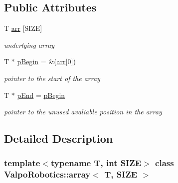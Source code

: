 \subsection*{Public Attributes}
\begin{DoxyCompactItemize}
\item 
\mbox{\label{class_valpo_robotics_1_1array_a7769453fad25835d0cf35f577bc62faa}} 
T \mbox{\hyperlink{class_valpo_robotics_1_1array_a7769453fad25835d0cf35f577bc62faa}{arr}} \mbox{[}S\+I\+ZE\mbox{]}
\begin{DoxyCompactList}\small\item\em underlying array \end{DoxyCompactList}\item 
\mbox{\label{class_valpo_robotics_1_1array_a31464f62e42309a1ef2476910cade587}} 
T $\ast$ \mbox{\hyperlink{class_valpo_robotics_1_1array_a31464f62e42309a1ef2476910cade587}{p\+Begin}} = \&(\mbox{\hyperlink{class_valpo_robotics_1_1array_a7769453fad25835d0cf35f577bc62faa}{arr}}\mbox{[}0\mbox{]})
\begin{DoxyCompactList}\small\item\em pointer to the start of the array \end{DoxyCompactList}\item 
\mbox{\label{class_valpo_robotics_1_1array_a63deade950411259aa7a55a80b672cdf}} 
T $\ast$ \mbox{\hyperlink{class_valpo_robotics_1_1array_a63deade950411259aa7a55a80b672cdf}{p\+End}} = \mbox{\hyperlink{class_valpo_robotics_1_1array_a31464f62e42309a1ef2476910cade587}{p\+Begin}}
\begin{DoxyCompactList}\small\item\em pointer to the unused avaliable position in the array \end{DoxyCompactList}\end{DoxyCompactItemize}


\subsection{Detailed Description}
\subsubsection*{template$<$typename T, int S\+I\+ZE$>$\newline
class Valpo\+Robotics\+::array$<$ T, S\+I\+Z\+E $>$}

